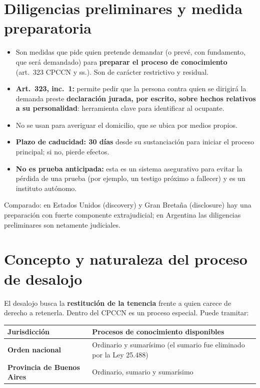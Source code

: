 
\section{Diligencias preliminares y medida preparatoria}

\begin{itemize}
  \item Son medidas que pide quien pretende demandar (o prevé, con fundamento, que será demandado) para \textbf{preparar el proceso de conocimiento} (art.\ 323 CPCCN y ss.). Son de carácter restrictivo y residual.
  \item \textbf{Art.\ 323, inc.\ 1:} permite pedir que la persona contra quien se dirigirá la demanda preste \textbf{declaración jurada, por escrito, sobre hechos relativos a su personalidad}: herramienta clave para identificar al ocupante.
  \item No se usan para averiguar el domicilio, que se ubica por medios propios.
  \item \textbf{Plazo de caducidad: 30 días} desde su sustanciación para iniciar el proceso principal; si no, pierde efectos.
  \item \textbf{No es prueba anticipada:} esta es un sistema asegurativo para evitar la pérdida de una prueba (por ejemplo, un testigo próximo a fallecer) y es un instituto autónomo.
\end{itemize}

Comparado: en Estados Unidos (discovery) y Gran Bretaña (disclosure) hay una preparación con fuerte componente extrajudicial; en Argentina las diligencias preliminares son netamente judiciales.

\section{Concepto y naturaleza del proceso de desalojo}

El desalojo busca la \textbf{restitución de la tenencia} frente a quien carece de derecho a retenerla. Dentro del CPCCN es un proceso especial. Puede tramitar:

\begin{center}
\begin{tabularx}{\textwidth}{>{\raggedright\arraybackslash}p{4.2cm} Y}
\toprule
\textbf{Jurisdicción} & \textbf{Procesos de conocimiento disponibles} \\
\midrule
\textbf{Orden nacional} & Ordinario y sumarísimo (el sumario fue eliminado por la Ley 25.488) \\
\addlinespace
\textbf{Provincia de Buenos Aires} & Ordinario, sumario y sumarísimo \\
\bottomrule
\end{tabularx}
\end{center}

